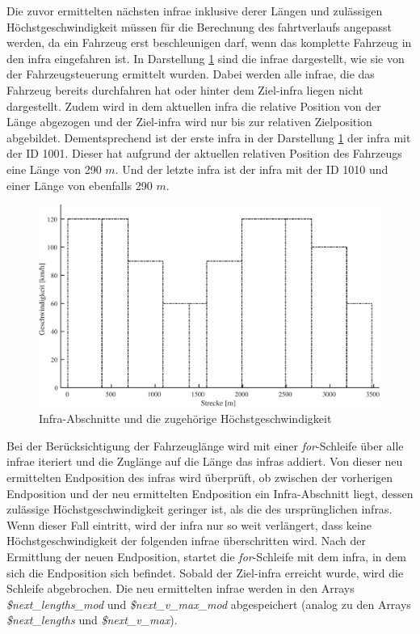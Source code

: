 Die zuvor ermittelten nächsten \ac{infra}e inklusive derer Längen und zulässigen Höchstgeschwindigkeit müssen für die Berechnung des \Gls{fahrtverlauf}s angepasst werden, da ein Fahrzeug erst beschleunigen darf, wenn das komplette Fahrzeug in den \ac{infra} eingefahren ist. In Darstellung \ref{fig:it1} sind die \ac{infra}e dargestellt, wie sie von der Fahrzeugsteuerung ermittelt wurden. Dabei werden alle \ac{infra}e, die das Fahrzeug bereits durchfahren hat oder hinter dem Ziel-\ac{infra} liegen nicht dargestellt. Zudem wird in dem aktuellen \ac{infra} die relative Position von der Länge abgezogen und der Ziel-\ac{infra} wird nur bis zur relativen Zielposition abgebildet. Dementsprechend ist der erste \ac{infra} in der Darstellung \ref{fig:it1} der \ac{infra} mit der ID 1001. Dieser hat aufgrund der aktuellen relativen Position des Fahrzeugs eine Länge von 290 $m$. Und der letzte \ac{infra} ist der \ac{infra} mit der ID 1010 und einer Länge von ebenfalls 290 $m$.
\begin{figure}
  \includegraphics[width=\linewidth]{../images/matlab/it1.pdf}
  \caption{Infra-Abschnitte und die zugehörige Höchstgeschwindigkeit}
  \label{fig:it1}
\end{figure}

Bei der Berücksichtigung der Fahrzeuglänge wird mit einer \textit{for}-Schleife über alle \ac{infra}e iteriert und die Zuglänge auf die Länge das \ac{infra}s addiert. Von dieser neu ermittelten Endposition des \ac{infra}s wird überprüft, ob zwischen der vorherigen Endposition und der neu ermittelten Endposition ein Infra-Abschnitt liegt, dessen zulässige Höchstgeschwindigkeit geringer ist, als die des ursprünglichen \ac{infra}s. Wenn dieser Fall eintritt, wird der \ac{infra} nur so weit verlängert, dass keine Höchstgeschwindigkeit der folgenden \ac{infra}e überschritten wird. Nach der Ermittlung der neuen Endposition, startet die \textit{for}-Schleife mit dem \ac{infra}, in dem sich die Endposition sich befindet. Sobald der Ziel-\ac{infra} erreicht wurde, wird die Schleife abgebrochen. Die neu ermittelten \ac{infra}e werden in den Arrays \textit{\$next\_lengths\_mod} und \textit{\$next\_v\_max\_mod} abgespeichert (analog zu den Arrays \textit{\$next\_lengths} und \textit{\$next\_v\_max}). 

